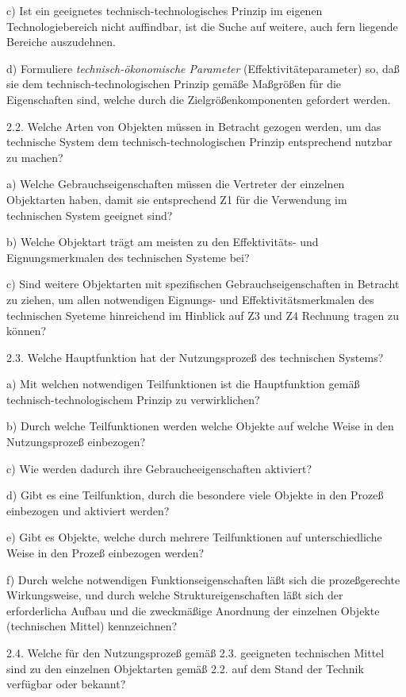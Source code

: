 \documentclass[11pt,a4paper]{article}
\begin{document}
c) Ist ein geeignetes technisch-technologisches Prinzip im eigenen
Technologiebereich nicht auffindbar, ist die Suche auf weitere, auch fern
liegende Bereiche auszudehnen.

d) Formuliere \emph{technisch-ökonomische Parameter} (Effektivitäteparameter)
so, daß sie dem technisch-technologischen Prinzip gemäße Maßgrößen für die
Eigenschaften sind, welche durch die Zielgrößenkomponenten gefordert werden.

2.2. Welche Arten von Objekten müssen in Betracht gezogen werden, um das
technische System dem technisch-technologischen Prinzip entsprechend nutzbar
zu machen?

a) Welche Gebrauchseigenschaften müssen die Vertreter der einzelnen
Objektarten haben, damit sie entsprechend Z1 für die Verwendung im technischen
System geeignet sind?

b) Welche Objektart trägt am meisten zu den Effektivitäts- und
Eignungsmerkmalen des technischen Systeme bei?

c) Sind weitere Objektarten mit spezifischen Gebrauchseigenschaften in
Betracht zu ziehen, um allen notwendigen Eignungs- und Effektivitätsmerkmalen
des technischen Syeteme hinreichend im Hinblick auf Z3 und Z4 Rechnung tragen
zu können?

2.3. Welche Hauptfunktion hat der Nutzungsprozeß des technischen Systems?

a) Mit welchen notwendigen Teilfunktionen ist die Hauptfunktion gemäß
technisch-techno\-logischem Prinzip zu verwirklichen?

b) Durch welche Teilfunktionen werden welche Objekte auf welche Weise in den
Nutzungsprozeß einbezogen?

c) Wie werden dadurch ihre Gebraucheeigenschaften aktiviert?

d) Gibt es eine Teilfunktion, durch die besondere viele Objekte in den Prozeß
einbezogen und aktiviert werden?

e) Gibt es Objekte, welche durch mehrere Teilfunktionen auf unterschiedliche
Weise in den Prozeß einbezogen werden?

f) Durch welche notwendigen Funktionseigenschaften läßt sich die
prozeßgerechte Wirkungsweise, und durch welche Struktureigenschaften läßt sich
der erforderlicha Aufbau und die zweckmäßige Anordnung der einzelnen Objekte
(technischen Mittel) kennzeichnen?

2.4. Welche für den Nutzungsprozeß gemäß 2.3. geeigneten technischen Mittel
sind zu den einzelnen Objektarten gemäß 2.2. auf dem Stand der Technik
verfügbar oder bekannt?
\end{document}
